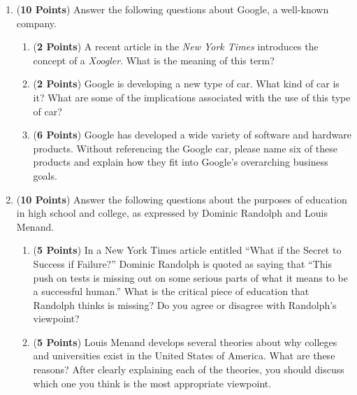 \documentclass[12pt]{article}
\begin{document}
\begin{enumerate}
\begin{enumerate}
\end{enumerate}

\newpage

\item ({\bf 10 Points}) Answer the following questions about Google, a well-known company. 

\begin{enumerate}

  \item ({\bf 2 Points}) A recent article in the {\em New York Times} introduces the concept of a {\em Xoogler}.  What
    is the meaning of this term?

  \item ({\bf 2 Points}) Google is developing a new type of car.  What kind of car is it? What are some of the
    implications associated with the use of this type of car?
  
  \item ({\bf 6 Points}) Google has developed a wide variety of software and hardware products.  Without referencing the
    Google car, please name six of these products and explain how they fit into Google's overarching business goals.


\end{enumerate}

\newpage

\item ({\bf 10 Points}) Answer the following questions about the
  purposes of education in high school and college, as expressed by
  Dominic Randolph and Louis Menand.

\begin{enumerate}

\item ({\bf 5 Points}) In a New York Times article entitled ``What if
  the Secret to Success if Failure?'' Dominic Randolph is quoted as
  saying that ``This push on tests is missing out on some serious
  parts of what it means to be a successful human.''  What is the
  critical piece of education that Randolph thinks is missing? Do you
  agree or disagree with Randolph's viewpoint?

\item ({\bf 5 Points}) Louis Menand develops several theories about why
  colleges and universities exist in the United States of America.
  What are these reasons?  After clearly explaining each of the
  theories, you should discuss which one you think is the most
  appropriate viewpoint.

\end{enumerate}


\end{enumerate}
\end{document}
